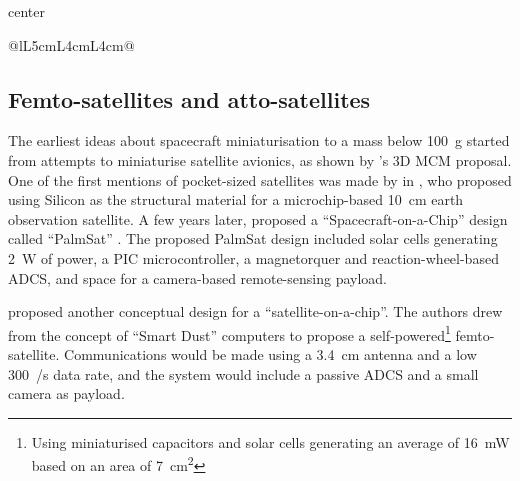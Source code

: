 \documentclass[a4paper,nobib,justified,final]{tufte-book}
\begin{document}
\begin{table}[p]
\begin{adjustbox}{center}
\begin{tabular}{@{}lL{5cm}L{4cm}L{4cm}@{}}
			\bottomrule
		\end{tabular}
	\end{adjustbox}
	\caption[Characteristics of different classes of sub-CubeSat programmes]{Characteristics of different classes of sub-CubeSat programmes. Criteria taken from \autocite{kalusCriteriaSoftwareProcess2013}.}
	\label{tab:mission-characteristics}
\end{table}

\subsection{Femto-satellites and atto-satellites}

The earliest ideas about spacecraft miniaturisation to a mass below \SI{100}{\gram} started from attempts to miniaturise satellite avionics, as shown by \citeauthor{alkalaiIntegratedMicrospacecraftAvionics1996}'s \autocite{alkalaiIntegratedMicrospacecraftAvionics1996} 3D \ac{MCM} proposal.
One of the first mentions of pocket-sized satellites was made by \citeauthor{jansonMassproducibleSiliconSpacecraft1999} in \citeyear{jansonMassproducibleSiliconSpacecraft1999} \autocite{jansonMassproducibleSiliconSpacecraft1999}, who proposed using Silicon as the structural material for a microchip-based \SI{10}{\centi\meter} earth observation satellite.
A few years later, \citeauthor{dasilvacurielSpacecraftonachip2003} \autocite{dasilvacurielSpacecraftonachip2003} proposed a  ``Spacecraft-on-a-Chip'' design called ``PalmSat'' \autocite{underwoodSCIENCEMISSIONSCENARIOS}.
The proposed PalmSat design included solar cells generating \SI{2}{\watt} of power, a PIC microcontroller, a magnetorquer and reaction-wheel-based \acs{ADCS}, and space for a camera-based remote-sensing payload.

\citeauthor{barnhartSatelliteonaChipFeasibilityStudy2006} \autocite{barnhartSatelliteonaChipFeasibilityStudy2006} proposed another conceptual design for a ``satellite-on-a-chip''. The authors drew from the concept of ``Smart Dust'' computers \autocite{warnekeSmartDustCommunicating2001} to propose a self-powered\footnote{Using miniaturised capacitors and solar cells generating an average of \SI{16}{\milli\watt} based on an area of \SI{7}{\centi\meter\squared}} femto-satellite. Communications would be made using a \SI{3.4}{\centi\meter} antenna and a low \SI{300}{\bit/\second} data rate, and the system would include a passive \acs{ADCS} and a small camera as payload.
\end{document}
